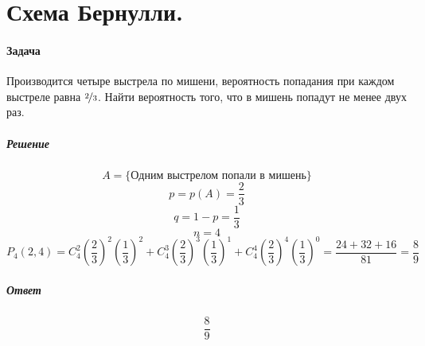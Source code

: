 \documentclass[fleqn, 10pt]{article}
\begin{document}
\section{Схема Бернулли.}
\paragraph{Задача}
Производится четыре выстрела по мишени, вероятность попадания при каждом выстреле равна \(\nicefrac{2}{3}\). Найти вероятность того, что в мишень попадут не менее двух раз.
\subparagraph{Решение}
\[A = \{\text{Одним выстрелом попали в мишень}\}\]
\[p = p(A) = \frac{2}{3}\]
\[q = 1 - p = \frac{1}{3}\]
\[n = 4\]
\[P_4(2, 4) = C^2_4\left(\frac{2}{3}\right)^2\left(\frac{1}{3}\right)^2+C^3_4\left(\frac{2}{3}\right)^3\left(\frac{1}{3}\right)^1+C^4_4\left(\frac{2}{3}\right)^4\left(\frac{1}{3}\right)^0 = \frac{24+32+16}{81} = \frac{8}{9} \]
\subparagraph{Ответ}
\[\frac{8}{9}\]
\end{document}
